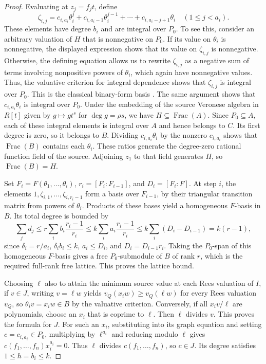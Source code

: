 \documentclass[12pt]{amsart}
\numberwithin{equation}{section}
\theoremstyle{definition}
\theoremstyle{remark}
\numberwithin{equation}{section}
\DeclareMathOperator{\Frac}{Frac}
\begin{document}
\begin{proof}
	Evaluating at $z_j=f_jt$, define
\[
\zeta_{i,j}=c_{i,a_i}\theta_i^j+
c_{i,a_i-1}\theta_i^{j-1}+\cdots+
c_{i,a_i-j+1}\theta_i
\quad(1\le j<a_i).
\]
These elements have degree $b_i$ and are integral over $P_0$.  To see this, consider an arbitrary valuation of $H$
that is nonnegative on $P_0$. If its value on $\theta_i$ is 	nonnegative, the displayed expression shows that its value on
$\zeta_{i,j}$ is nonnegative. Otherwise, the defining equation 	allows us to rewrite $\zeta_{i,j}$ as a negative sum of terms
involving nonpositive powers of $\theta_i$, which again have 	nonnegative values. Thus, the valuative criterion for integral
dependence shows that $\zeta_{i,j}$ is integral over $P_0$.
This is the classical binary-form basis \cite[Section~2.1]{Wood}. The same argument shows that
$c_{i,a_i}\theta_i$ is integral over $P_0$.   Under the embedding of the source Veronese algebra in $R[t]$ given by $g\mapsto g t^s$ for $\deg g=\rho s$, we have $H\subseteq\Frac (A)$. Since $P_0\subseteq A$, each of these integral elements is integral over $A$ and hence belongs to $C$. Its first degree is zero, so it belongs to $B$. Dividing $c_{i,a_i}\theta_i$ by the nonzero $c_{i,a_i}$ shows that $\Frac (B)$ contains each $\theta_i$. These ratios generate the degree-zero rational function field of the source. Adjoining $z_1$ to that field generates $H$, so $\Frac (B)=H$.

	Set $F_i=F(\theta_1,\ldots,\theta_i)$, $r_i=[F_i:F_{i-1}]$, and $D_i=[F_i:F]$.  At step $i$, the elements $1,\zeta_{i,1},\ldots,\zeta_{i,r_i-1}$ 
	form a basis over $F_{i-1}$, by their triangular transition matrix from  powers   of $\theta_i$.
Products of these bases yield a homogeneous $F$-basis in $B$. Its total degree is bounded by
\[
	\sum_jd_j\le r\sum_i b_i\frac{r_i-1}{r_i}\le k\sum_i a_i\frac{r_i-1}{r_i}\le k\sum_i(D_i-D_{i-1})=k(r-1),
\]
since $\delta_i=r/a_i$, $\delta_i b_i\le k$,
$a_i\le D_i$, and $D_i=D_{i-1}r_i$.
Taking the $P_0$-span of this homogeneous $F$-basis gives a free $P_0$-submodule of $B$ of rank $r$,
	which is the required full-rank free lattice. This proves the lattice bound.
	
Choosing $\ell$  also  to attain the minimum source value at each Rees valuation of $I$, if $v\in J$,  writing $v=\ell w$ yields
$v_Q(x_iw)\ge v_Q(\ell w)$ for every Rees valuation $v_Q$, so $\theta_iv=x_iw\in B$ by the valuative criterion.
Conversely, if all $x_iv/\ell$ are polynomials, choose an $x_i$ that is coprime to $\ell$. Then $\ell$ divides $v$.
This proves the formula for $J$.
For such an $x_i$,  substituting into  its graph equation  and setting $c=c_{i,a_i}\in P_0$,  multiplying by $\ell^{a_i}$ and
reducing modulo $\ell$ gives $c(f_1,\ldots,f_n)x_i^{a_i}=0$. Thus $\ell$ divides $c(f_1,\ldots,f_n)$, so $c\in J$.
Its degree satisfies $1\le h=b_i\le k$.
\end{proof}
\end{document}
